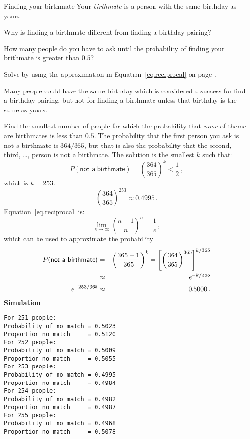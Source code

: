 
\begin{prob}{Finding your birthmate}
Your \emph{birthmate} is a person with the same birthday as yours.

Why is finding a birthmate different from finding a birthday pairing?

 How many people do you have to ask until the probability of finding your brithmate is greater than $0.5$?

Solve by using the approximation in Equation~\ref{eq.reciprocal} on page~\pageref{eq.reciprocal}.
\end{prob}

\solution{}

Many people could have the same birthday which is considered a success for find a birthday pairing, but not for finding a birthmate unless that birthday is the same as yours.

Find the smallest number of people for which the probability that \emph{none} of theme are birthmates is less than $0.5$. The probability that the first person you ask is not a birthmate is $364/365$, but that is also the probability that the second, third, \ldots, person is not a birthmate. The solution is the smallest $k$ such that:
\[
P(\textsf{not a birthmate})=\left(\frac{364}{365}\right)^k<\frac{1}{2}\,,
\]
which is $k=253$:
\[
\left(\frac{364}{365}\right)^{253} \approx 0.4995\,.
\]
Equation~\ref{eq.reciprocal} is:
\[
\lim_{n\rightarrow\infty}\left(\frac{n-1}{n}\right)^{n}=\frac{1}{e}\,,
\]
which can be used to approximate the probability:
\begin{eqnarray*}
P(\textsf{not a birthmate})&=&
  \left(\displaystyle\frac{365-1}{365}\right)^k=\left[\left(\displaystyle\frac{364}{365}\right)^{365}\right]^{k/365}\\
&\approx& e^{-k/365}\\
e^{-253/365}&\approx&0.5000\,.
\end{eqnarray*}
\textbf{Simulation}
\begin{verbatim}
For 251 people:
Probability of no match = 0.5023
Proportion no match     = 0.5120
For 252 people:
Probability of no match = 0.5009
Proportion no match     = 0.5055
For 253 people:
Probability of no match = 0.4995
Proportion no match     = 0.4984
For 254 people:
Probability of no match = 0.4982
Proportion no match     = 0.4987
For 255 people:
Probability of no match = 0.4968
Proportion no match     = 0.5078
\end{verbatim}


